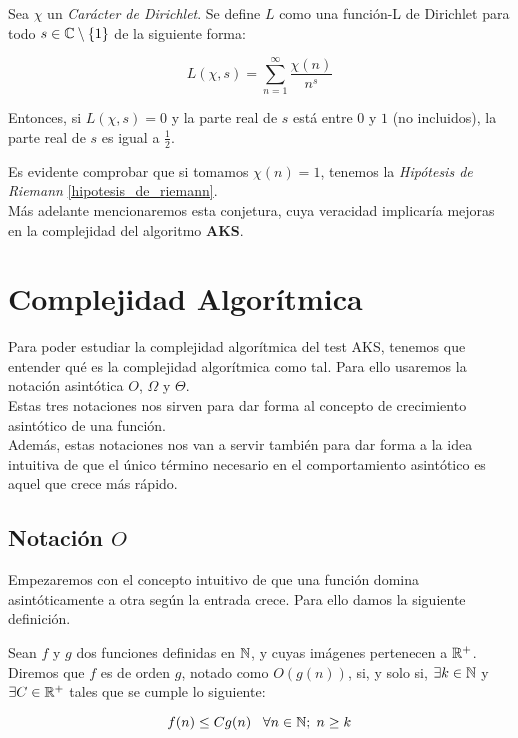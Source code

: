 \begin{conjetura}\label{hipotesis_generalizada_de_riemann}
	Sea $\chi$ un \textit{Carácter de Dirichlet}. Se define $L$ como una función-L de Dirichlet para todo $s \in \mathbb{C} \setminus \{1\}$ de la siguiente forma:
	
	\begin{equation}
	L(\chi, s) = \sum_{n=1}^{\infty}\frac{\chi(n)}{n^s}
	\end{equation}
	
	Entonces, si $L(\chi, s) = 0$ y la parte real de $s$ está entre $0$ y $1$ (no incluidos), la parte real de $s$ es igual a $\frac{1}{2}$.
\end{conjetura}

Es evidente comprobar que si tomamos $\chi(n) = 1$, tenemos la \textit{Hipótesis de Riemann} \ref{hipotesis_de_riemann}.\\

Más adelante mencionaremos esta conjetura, cuya veracidad implicaría mejoras en la complejidad del algoritmo \textbf{AKS}.

\section{Complejidad Algorítmica}

Para poder estudiar la complejidad algorítmica del test AKS, tenemos que entender qué es la complejidad algorítmica como tal. Para ello usaremos la notación asintótica $O$, $\Omega$ y $\Theta$.\\

Estas tres notaciones nos sirven para dar forma al concepto de crecimiento asintótico de una función.\\

Además, estas notaciones nos van a servir también para dar forma a la idea intuitiva de que el único término necesario en el comportamiento asintótico es aquel que crece más rápido.

\subsection{Notación $O$}

Empezaremos con el concepto intuitivo de que una función domina asintóticamente a otra según la entrada crece. Para ello damos la siguiente definición.

\begin{definicion}
	Sean $f$ y $g$ dos funciones definidas en $\mathbb{N}$, y cuyas imágenes pertenecen a $\mathbb{R}^+$. Diremos que $f$ es de orden $g$, notado como $O(g(n))$, si, y solo si, $\exists k \in \mathbb{N}$ y $\exists C \in \mathbb{R}^+$ tales que se cumple lo siguiente:
	
	$$f(n) \leq Cg(n) \;\;\;\forall n \in \mathbb{N};\; n \geq k$$
\end{definicion}

